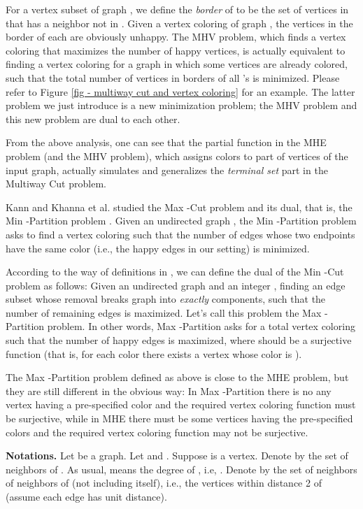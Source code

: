 \documentclass[11pt]{article}
\begin{document}
For a vertex subset  of graph , we define the {\em border}
of  to be the set of vertices in  that has a neighbor not in .
Given a vertex coloring  of graph ,
the vertices in the border of each  are obviously unhappy.
The MHV problem, which finds a vertex coloring that maximizes the number of
happy vertices, is actually equivalent to finding a vertex coloring
 for a graph in which some vertices are already
colored, such that the total number of vertices in borders of all 's
is minimized. Please refer to Figure \ref{fig - multiway cut and vertex coloring}
for an example. The latter problem we just introduce is a new minimization
problem; the MHV problem and this new problem are dual to each other.

From the above analysis, one can see that the partial function  in
the MHE problem (and the MHV problem), which assigns colors to part of
vertices of the input graph, actually simulates and generalizes
the {\em terminal set} part in the Multiway Cut problem.

Kann and Khanna et al. \cite{KKL+97} studied the Max -Cut problem \cite{FJ97}
and its dual, that is, the Min -Partition problem \cite{KKL+97}.
Given an undirected graph , the Min -Partition problem asks
to find a vertex coloring 
such that the number of edges whose two endpoints have the same color
(i.e., the happy edges in our setting) is minimized.

According to the way of definitions in \cite{KKL+97}, we can define
the dual of the Min -Cut problem \cite{SV95} as follows:
Given an undirected graph  and an integer ,
finding an edge subset whose removal breaks graph  into {\em exactly}
 components, such that the number of remaining edges is maximized.
Let's call this problem the Max -Partition problem.
In other words, Max -Partition asks for a total vertex coloring
 such that the number of
happy edges is maximized, where  should be a surjective function
(that is, for each color  there exists a vertex whose color is ).

The Max -Partition problem defined as above is close to the MHE problem,
but they are still different in the obvious way:
In Max -Partition there is no any vertex having a pre-specified
color and the required vertex coloring function  must be surjective,
while in MHE there must be some vertices having the pre-specified colors
and the required vertex coloring function  may not be surjective.




\bigskip
{\bf Notations.}
Let  be a graph. Let  and .
Suppose  is a vertex. Denote by  the set of neighbors of .
As usual,  means the degree of , i.e, .
Denote by  the set of neighbors of neighbors of  (not including
 itself), i.e., the vertices within distance 2 of  (assume each edge
has unit distance).
\end{document}
